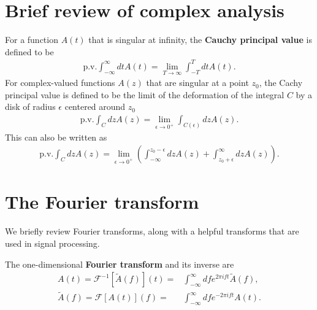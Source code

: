 \section{Brief review of complex analysis}

For a function $A\left(t\right)$ that is singular at infinity, 
the \textbf{Cauchy principal value} is defined to be
\begin{align}
    \mathrm{p.v.}\int_{-\infty}^{\infty} dt A\left(t\right)
    =
    \lim_{T\to\infty}\int_{-T}^{T}dt A\left(t\right)
    .
\end{align}
For complex-valued functions $A\left(z\right)$ that are singular at a point $z_0$, 
the Cachy principal value is defined to be the limit of the deformation of the integral 
$C$ by a disk of radius $\epsilon$ centered around $z_0$
\begin{align}
    \mathrm{p.v.}\int_{C} dz A\left(z\right)
    =
    \lim_{\epsilon\to0^+}
        \int_{C\left(\epsilon\right)}dz A\left(z\right)
    .
\end{align}
This can also be written as
\begin{align}
    \mathrm{p.v.}\int_{C} dz A\left(z\right)
    =
    \lim_{\epsilon\to0^+}
        \left(
            \int_{-\infty}^{z_0-\epsilon}dz A\left(z\right)
            +
            \int_{z_0+\epsilon}^{\infty}dz A\left(z\right)
        \right)
    .
\end{align}
\section{The Fourier transform}

We briefly review Fourier transforms, along with a helpful transforms that
are used in signal processing.

The one-dimensional \textbf{Fourier transform} and its inverse are
\begin{subequations}
\begin{align}
    A\left(t\right)
    =
    \mathcal{F}^{-1}\left[\tilde{A}\left(f\right)\right]\left(t\right)
    =&
    \int_{-\infty}^{\infty}df e^{ 2\pi i ft} \tilde{A}\left(f\right)
    ,\\
    \tilde{A}\left(f\right)
    =
    \mathcal{F}\left[A\left(t\right)\right]\left(f\right)
    =&
    \int_{-\infty}^{\infty}df e^{-2\pi i ft} A\left(t\right)
    . 
\end{align}
\end{subequations}

